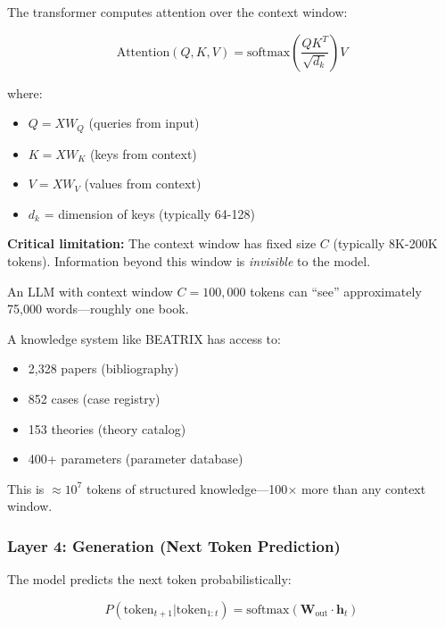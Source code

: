 The transformer computes attention over the context window:

\begin{equation}
\text{Attention}(Q, K, V) = \text{softmax}\left(\frac{QK^T}{\sqrt{d_k}}\right) V
\end{equation}

where:
\begin{itemize}[nosep]
    \item $Q = XW_Q$ (queries from input)
    \item $K = XW_K$ (keys from context)
    \item $V = XW_V$ (values from context)
    \item $d_k$ = dimension of keys (typically 64-128)
\end{itemize}

\textbf{Critical limitation:} The context window has fixed size $C$ (typically 8K-200K tokens). Information beyond this window is \textit{invisible} to the model.

\begin{tcolorbox}[colback=yellow!5!white, colframe=yellow!75!black,
    title=Technical Insight: The Context Window Problem]
An LLM with context window $C = 100,000$ tokens can ``see'' approximately 75,000 words---roughly one book.

A knowledge system like BEATRIX has access to:
\begin{itemize}[nosep]
    \item 2,328 papers (bibliography)
    \item 852 cases (case registry)
    \item 153 theories (theory catalog)
    \item 400+ parameters (parameter database)
\end{itemize}

This is $\approx 10^7$ tokens of structured knowledge---100$\times$ more than any context window.
\end{tcolorbox}

\subsubsection{Layer 4: Generation (Next Token Prediction)}

The model predicts the next token probabilistically:

\begin{equation}
P(\text{token}_{t+1} | \text{token}_{1:t}) = \text{softmax}(\mathbf{W}_{\text{out}} \cdot \mathbf{h}_t)
\end{equation}

